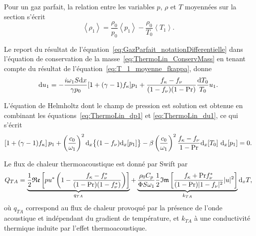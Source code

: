 Pour un gaz parfait, la relation entre les variables $p$, $\rho$ et $T$ moyennées sur la section s'écrit
\begin{equation}
	\left\langle \rho_1 \right\rangle = \frac{\rho_0}{p_0} \left\langle p_1 \right\rangle - \frac{\rho_0}{T_0} \left\langle T_1 \right\rangle.
	\label{eq:GazParfait_notationDifferentielle}
\end{equation}

Le report du résultat de l'équation~\eqref{eq:GazParfait_notationDifferentielle} dans l'équation de conservation de la masse~\eqref{eq:ThermoLin_ConservMass} en tenant compte du résultat de l'équation~\eqref{eq:T_1_moyenne_fkappa}, donne
\begin{equation}
	\mathrm{d} u_1	= -\frac{i \omega_1 S \mathrm{d} x}{\gamma p_0}[1+(\gamma-1)f_\kappa]p_1 + \frac{f_\kappa - f_\nu}{(1-f_\nu)(1-\mathrm{Pr})}\frac{\mathrm{d} T_0}{T_0}u_1.
	\label{eq:ThermoLin_du1}
\end{equation} 


L'équation de Helmholtz dont le champ de pression est solution est obtenue en combinant les équations~\eqref{eq:ThermoLin_dp1} et \eqref{eq:ThermoLin_du1}, ce qui s'écrit~\cite{rott_damped_1969, swift_thermoacoustic_1988, swift_thermoacoustics_2017}
\begin{equation}
	\left[1+(\gamma-1)f_\kappa\right]p_1+\left(\frac{c_0}{\omega_1}\right)^2\mathrm{d}_x \big\{(1-f_\nu)\mathrm{d}_x [p_1]\big\} - \beta \left(\frac{c_0}{\omega_1}\right)^2 \frac{f_\kappa - f_\nu}{1-\mathrm{Pr}} \mathrm{d}_x [T_0]\ \mathrm{d}_x [p_1] = 0.
	\label{eq:Rott_Swift_WaveEquation}
\end{equation}


Le flux de chaleur thermoacoustique est donné par Swift \cite{swift_thermoacoustics_2017} par
\begin{equation}
	Q_{TA} = \underbrace{\frac{1}{2} \mathfrak{Re}\left[pu^* \left( 1 - \frac{f_\kappa - f_\nu^*}{(1 - \mathrm{Pr})(1 - f_\nu^*)} \right) \right]}_{q_{TA}} + \underbrace{\frac{\rho_0 C_p }{\Phi S \omega_1 } \frac{1}{2} \mathfrak{Im} \left[ \frac{f_\kappa + \mathrm{Pr} f_\nu^*}{(1-\mathrm{Pr})|1-f_\nu|^2} |u|^2\right]}_{k_{TA}} \mathrm{d}_x T,
	\label{eq:FluxTA_swift}
\end{equation}
où $q_{TA}$ correspond au flux de chaleur provoqué par la présence de l'onde acoustique et indépendant du gradient de température, et $k_{TA}$ à une conductivité thermique induite par l'effet thermoacoustique.



